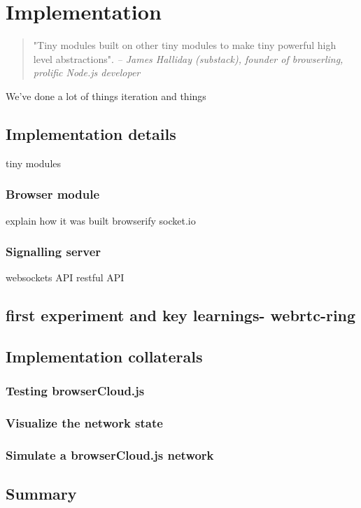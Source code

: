 \chapter{Implementation}\label{ch:implemenation}

\begin{quotation}
"Tiny modules built on other tiny modules to make tiny powerful high level abstractions".
{\small\it -- James Halliday (substack), founder of browserling, prolific Node.js developer}
\end{quotation}

We've done a lot of things
iteration and things


\section{Implementation details}

tiny modules

\subsection{Browser module}

explain how it was built
browserify
socket.io


\subsection{Signalling server}

websockets API
restful API


\section{first experiment and key learnings- webrtc-ring}


\section{Implementation collaterals}

\subsection{Testing browserCloud.js}

\subsection{Visualize the network state}

\subsection{Simulate a browserCloud.js network}

\section{Summary}
